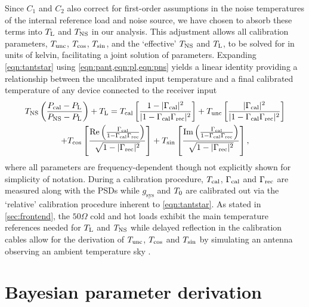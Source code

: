 Since $C_1$ and $C_2$ also correct for first-order assumptions in the noise temperatures of the internal reference load and noise source, we have chosen to absorb these terms into $T_{\mathrm{L}}$ and $T_{\mathrm{NS}}$ in our analysis. This adjustment allows all calibration parameters, $T_{\mathrm{unc}}$, $T_{\mathrm{cos}}$, $T_{\mathrm{sin}}$, and the ‘effective’ $T_{\mathrm{NS}}$ and $T_{\mathrm{L}}$, to be solved for in units of kelvin, facilitating a joint solution of parameters. Expanding \cref{eqn:tantstar} using \cref{eqn:pant,eqn:pl,eqn:pns} yields a linear identity providing a relationship between the uncalibrated input temperature and a final calibrated temperature of any device connected to the receiver input
\begin{multline}
  \label{eqn:caleqn}
  T_{\mathrm{NS}}\left( \frac{P_{\mathrm{cal}} - P_{\mathrm{L}}}{P_{\mathrm{NS}} - P_{\mathrm{L}}} \right) + T_{\mathrm{L}} = T_{\mathrm{cal}}\left[ \frac{1-|\Gamma_{\mathrm{cal}}|^2}{|1-\Gamma_{\mathrm{cal}}\Gamma_{\mathrm{rec}}|^2} \right]
  + T_{\mathrm{unc}}\left[ \frac{|\Gamma_{\mathrm{cal}}|^2}{|1-\Gamma_{\mathrm{cal}}\Gamma_{\mathrm{rec}}|^2} \right] \\
  + T_{\mathrm{cos}}\left[ \frac{\operatorname{Re}\left(\frac{\Gamma_{\mathrm{cal}}}{1-\Gamma_{\mathrm{cal}}\Gamma_{\mathrm{rec}}}\right)}{\sqrt{1-|\Gamma_{\mathrm{rec}}|^2}} \right]
  + T_{\mathrm{sin}}\left[ \frac{\operatorname{Im}\left(\frac{\Gamma_{\mathrm{cal}}}{1-\Gamma_{\mathrm{cal}}\Gamma_{\mathrm{rec}}}\right)}{\sqrt{1-|\Gamma_{\mathrm{rec}}|^2}} \right],
\end{multline}
where all parameters are frequency-dependent though not explicitly shown for simplicity of notation. During a calibration procedure, $T_{\mathrm{cal}}$, $\Gamma_{\mathrm{cal}}$ and $\Gamma_{\mathrm{rec}}$ are measured along with the PSDs while $g_{\mathrm{sys}}$ and $T_{\mathrm{0}}$ are calibrated out via the `relative' calibration procedure inherent to \cref{eqn:tantstar}. As stated in \cref{sec:frontend}, the $50 \Omega$ cold and hot loads exhibit the main temperature references needed for $T_{\mathrm{L}}$ and $T_{\mathrm{NS}}$ while delayed reflection in the calibration cables allow for the derivation of $T_{\mathrm{unc}}$, $T_{\mathrm{cos}}$ and $T_{\mathrm{sin}}$ by simulating an antenna observing an ambient temperature sky \citep{rogersCal}.


\section{Bayesian parameter derivation}\label{sec:bayes}